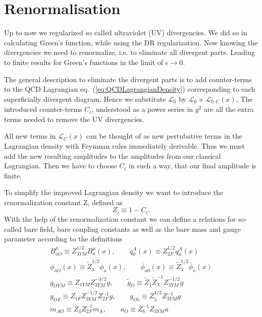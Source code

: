 \section{Renormalisation}
Up to now we regularized so called ultraviolet (UV) divergencies. We did so in calculating Green's function, while using the DR regularization. Now knowing the divergencies we need to renormalize, i.e. to eliminate all divergent parts. Leading to finite results for Green's functions in the limit of $\epsilon \rightarrow 0$.
\par
The general description to eliminate the divergent parts is to add counter-terms to the QCD Lagrangian eq.~(\ref{eq:QCDLagrangianDensity}) corresponding to each superficially divergent diagram. Hence we substitute $\mathcal{L}_{0}$ by $\mathcal{L}_{0} + \mathcal{L}_{0,C}(x)$. The introduced counter-terms $C_i$, understood as a power series in $g^2$ are all the extra terms needed to remove the UV divergencies.
\par
All new terms in $\mathcal{L}_C(x)$ can be thought of as new pertubative terms in the Lagrangian density with Feynman rules immediately derivable. Thus we must add the new resulting amplitudes to the amplitudes from our classical Lagrangian. Then we have to choose $C_i$ in such a way, that our final amplitude is finite.
\par
To simplify the improved Lagrangian density we want to introduce the renormalization constant Z, defined as
\begin{equation}
	Z_i \equiv 1 - C_i.
\end{equation}
With the help of the renormalization constant we can define a relations for so-called bare field, bare coupling constants as well as the bare mass and gauge parameter according to the definitions
\begin{equation}
	\label{eq:bareeq:bare}
	\begin{split}
		B^\mu_{aO} \equiv Z^{1/2}_{3YM} B^\mu_a(x), \qquad q^A_0(x) \equiv Z^{1/2}_{2F} q^A_\alpha (x) \\
		\phi_{aO}(x) \equiv \tilde Z^{1/2}_3 \phi_a(x), \qquad \bar \phi_{a0}(x) \equiv \tilde Z^{1/2}_3 \bar \phi_a(x) \\
		g_{OYM} \equiv Z_{1YM} Z^{-3/2}_{3YM}g, \qquad \tilde g_O \equiv \tilde Z_1 \tilde Z^{-1}_3 Z^{-1/2}_{3YM} g \\
		g_{OF} \equiv Z_{1F} Z^{-1/2}_{3YM} Z^{-1}_{2F} g, \qquad g_{O5} \equiv Z^{1/2}_5 Z^{-1}_{3YM} g \\
		m_{AO} \equiv Z_4 Z^{-1}_{2F} m_A, \qquad a_O \equiv Z^{-1}_6 Z_{3YM} a
	\end{split}
\end{equation}
